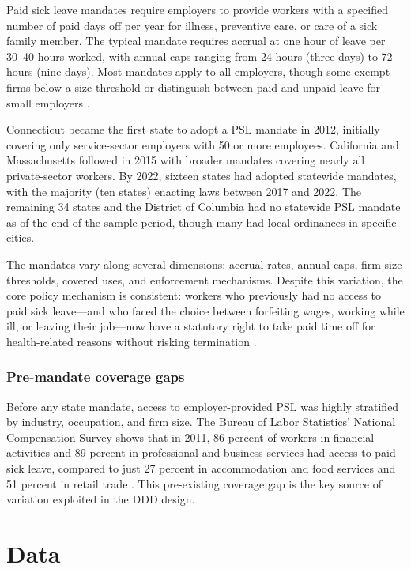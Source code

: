 \documentclass[12pt]{article}
\begin{document}
Paid sick leave mandates require employers to provide workers with a specified number of paid days off per year for illness, preventive care, or care of a sick family member. The typical mandate requires accrual at one hour of leave per 30--40 hours worked, with annual caps ranging from 24 hours (three days) to 72 hours (nine days). Most mandates apply to all employers, though some exempt firms below a size threshold or distinguish between paid and unpaid leave for small employers \citep{ncsl2023}.

Connecticut became the first state to adopt a PSL mandate in 2012, initially covering only service-sector employers with 50 or more employees. California and Massachusetts followed in 2015 with broader mandates covering nearly all private-sector workers. By 2022, sixteen states had adopted statewide mandates, with the majority (ten states) enacting laws between 2017 and 2022. The remaining 34 states and the District of Columbia had no statewide PSL mandate as of the end of the sample period, though many had local ordinances in specific cities.

The mandates vary along several dimensions: accrual rates, annual caps, firm-size thresholds, covered uses, and enforcement mechanisms. Despite this variation, the core policy mechanism is consistent: workers who previously had no access to paid sick leave---and who faced the choice between forfeiting wages, working while ill, or leaving their job---now have a statutory right to take paid time off for health-related reasons without risking termination \citep{ncsl2023}.

\subsubsection*{Pre-mandate coverage gaps} Before any state mandate, access to employer-provided PSL was highly stratified by industry, occupation, and firm size. The Bureau of Labor Statistics' National Compensation Survey shows that in 2011, 86 percent of workers in financial activities and 89 percent in professional and business services had access to paid sick leave, compared to just 27 percent in accommodation and food services and 51 percent in retail trade \citep{bls2023ebs}. This pre-existing coverage gap is the key source of variation exploited in the DDD design.

\section{Data}
\end{document}
